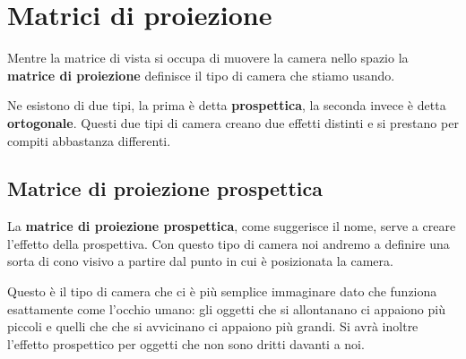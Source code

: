 \section{Matrici di proiezione}
Mentre la matrice di vista si occupa di muovere la camera nello spazio la \textbf{matrice di proiezione} definisce il
tipo di camera che stiamo usando.

Ne esistono di due tipi, la prima \`e detta \textbf{prospettica}, la seconda invece \`e detta \textbf{ortogonale}.
Questi due tipi di camera creano due effetti distinti e si prestano per compiti abbastanza differenti.

\subsection{Matrice di proiezione prospettica}
La \textbf{matrice di proiezione prospettica}, come suggerisce il nome, serve a creare l'effetto della prospettiva.
Con questo tipo di camera noi andremo a definire una sorta di cono visivo a partire dal punto in cui \`e posizionata
la camera.

Questo \`e il tipo di camera che ci \`e pi\`u semplice immaginare dato che funziona esattamente come l'occhio umano:
gli oggetti che si allontanano ci appaiono pi\`u piccoli e quelli che che si avvicinano ci appaiono pi\`u grandi.
Si avr\`a inoltre l'effetto prospettico per oggetti che non sono dritti davanti a noi.

\begin{center}
\end{center}
